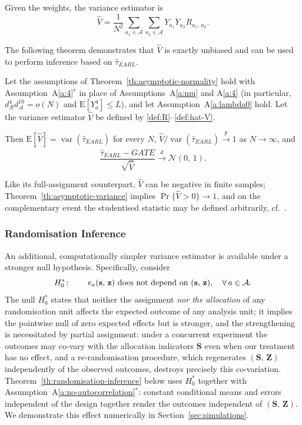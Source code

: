 \documentclass[sigconf,anonymous,review]{acmart}
\newcounter{assumption}
\newcommand{\E}{\mathrm E}
\DeclareMathOperator{\var}{var}
\begin{document}
Given the weights, the variance estimator is
\begin{equation}\label{def:hat-V}
    \hat V = \frac 1 {N^2} \sum_{a_1\in\mathcal A}\sum_{a_2\in\mathcal A} Y_{a_1}Y_{a_2}R_{a_1,\,a_2}.
\end{equation}

The following theorem demonstrates that $\hat V$ is exactly unbiased and can be used to perform inference based on $\hat\tau_{EARL}^{\phantom{1}}$.

\begin{theorem}\label{th:asymptotic-variance}
    Let the assumptions of Theorem~\ref{th:asymptotic-normality} hold with Assumption~A\ref{a:4}$^*$ in place of Assumptions~A\ref{a:mu} and A\ref{a:4} (in particular, $d^{4}_{\mathcal{R}}d^{10}_{\mathcal{A}}=o(N)$ and $\E[Y_a^4]\le L$), and let Assumption~A\ref{a:lambda0} hold. Let the variance estimator $\hat V$ be defined by \eqref{def:R}--\eqref{def:hat-V}.

    Then $\E[\hat V] = \var(\hat\tau^{\phantom{1}}_{EARL})$ for every $N$, $\hat V / \var(\hat\tau^{\phantom{1}}_{EARL})\stackrel{p}{\to} 1$ as $N\to\infty$, and
    $$
        \frac{\hat\tau^{\phantom{1}}_{EARL} - GATE}{\sqrt{\hat V}} \stackrel{d}{\to} \mathcal N(0,\,1).
    $$
\end{theorem}

Like its full-assignment counterpart, $\hat V$ can be negative in finite samples; Theorem~\ref{th:asymptotic-variance} implies $\Pr\{\hat V>0\}\to1$, and on the complementary event the studentised statistic may be defined arbitrarily, cf.\ \cite{harshaw2023erl}.

\subsubsection{Randomisation Inference}\label{subsubsec:ri}

An additional, computationally simpler variance estimator is available under a stronger null hypothesis. Specifically, consider
\begin{equation}\label{def:strong-null}
    H_0^*\colon\qquad e_a(\mathbf s,\,\mathbf z)\ \textup{does not depend on }(\mathbf s,\,\mathbf z),\quad \forall\,a\in\mathcal A.
\end{equation}
The null $H_0^*$ states that neither the assignment \emph{nor the allocation} of any randomisation unit affects the expected outcome of any analysis unit; it implies the pointwise null of zero expected effects but is stronger, and the strengthening is necessitated by partial assignment: under a concurrent experiment the outcomes may co-vary with the allocation indicators $\mathbf S$ even when our treatment has no effect, and a re-randomisation procedure, which regenerates $(\mathbf S,\,\mathbf Z)$ independently of the observed outcomes, destroys precisely this co-variation. Theorem~\ref{th:randomisation-inference} below uses $H_0^*$ together with Assumption~A\ref{a:no-autocorrelation}$^*$: constant conditional means and errors independent of the design together render the outcomes independent of $(\mathbf S,\,\mathbf Z)$. We demonstrate this effect numerically in Section~\ref{sec:simulations}.
\end{document}
